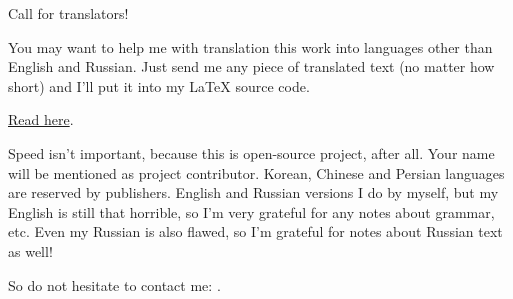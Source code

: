 \vspace*{\fill}

\Huge Call for translators!

\normalsize

\bigskip
\bigskip
\bigskip

You may want to help me with translation this work into languages other than English and Russian.
Just send me any piece of translated text (no matter how short) and I'll put it into my LaTeX source code.

\href{https://github.com/dennis714/RE-for-beginners/blob/master/Translation.md}{Read here}.

Speed isn't important, because this is open-source project, after all.
Your name will be mentioned as project contributor.
Korean, Chinese and Persian languages are reserved by publishers.
English and Russian versions I do by myself, but my English is still that horrible, so I'm very grateful for any notes about grammar, etc.
Even my Russian is also flawed, so I'm grateful for notes about Russian text as well!%

So do not hesitate to contact me: \GTT{\EMAIL}.

\vspace*{\fill}
\vfill
